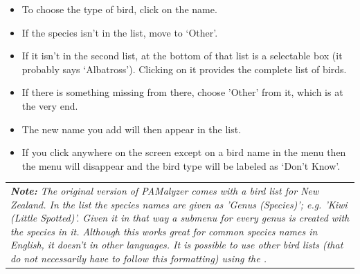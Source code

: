 \documentclass{scrartcl}
\begin{document}
\begin{itemize}
	\begin{itemize}
		\item To choose the type of bird, click on the name. 
		\item If the species isn't in the list, move to `Other'. 
		\item If it isn't in the second list, at the bottom of that list is a selectable box (it probably says `Albatross'). Clicking on it provides the complete list of birds. 
		\item If there is something missing from there, choose 'Other' from it, which is at the very end.
		\item The new name you add will then appear in the list. 
		\item If you click anywhere on the screen except on a bird name in the menu then the menu will disappear and the bird type will be labeled as `Don't Know'. 
	\end{itemize}
		\begin{table}[ht!]
		\centering
		\begin{tabular}{p{}}
			\textit{\textbf{Note:} The original version of PAMalyzer comes with a bird list for New Zealand. In the list the species names are given as 'Genus (Species)'; e.g. 'Kiwi (Little Spotted)'. Given it in that way a submenu for every genus is created with the species in it. Although this works great for common species names in English, it doesn't in other languages. It is possible to use other bird lists (that do not necessarily have to follow this formatting) using the \textit{\nameref{sec:interfacesettings}}.}\\
		\end{tabular}
	\end{table}



\end{itemize}
\end{document}

